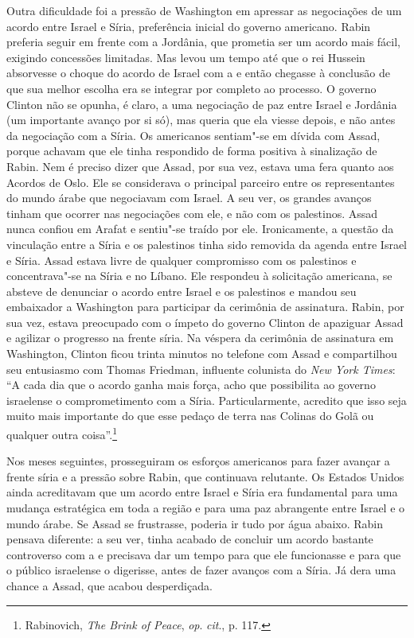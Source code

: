 Outra dificuldade foi a pressão de Washington em apressar as negociações de
um acordo entre Israel e Síria, preferência inicial do governo
americano. Rabin preferia seguir em frente com a Jordânia, que prometia
ser um acordo mais fácil, exigindo concessões limitadas. Mas levou um
tempo até que o rei Hussein absorvesse o choque do acordo de Israel com
a  e então chegasse à conclusão de que sua melhor escolha era se
integrar por completo ao processo. O governo Clinton não se opunha, é
claro, a uma negociação de paz entre Israel e Jordânia (um importante
avanço por si só), mas queria que ela viesse depois, e não antes da
negociação com a Síria. Os americanos sentiam"-se em dívida com Assad,
porque achavam que ele tinha respondido de forma positiva à sinalização
de Rabin. Nem é preciso dizer que Assad, por sua vez, estava uma fera
quanto aos Acordos de Oslo. Ele se considerava o principal parceiro
entre os representantes do mundo árabe que negociavam com Israel. A seu
ver, os grandes avanços tinham que ocorrer nas negociações com ele, e
não com os palestinos. Assad nunca confiou em Arafat e sentiu"-se traído
por ele. Ironicamente, a questão da vinculação entre a Síria e os
palestinos tinha sido removida da agenda entre Israel e Síria. Assad
estava livre de qualquer compromisso com os palestinos e concentrava"-se
na Síria e no Líbano. Ele respondeu à solicitação americana, se absteve
de denunciar o acordo entre Israel e os palestinos e mandou seu
embaixador a Washington para participar da cerimônia de assinatura.
Rabin, por sua vez, estava preocupado com o ímpeto do governo Clinton de
apaziguar Assad e agilizar o progresso na frente síria. Na véspera da
cerimônia de assinatura em Washington, Clinton ficou trinta minutos no
telefone com Assad e compartilhou seu entusiasmo com Thomas Friedman,
influente colunista do \emph{New York Times}: ``A cada dia que o acordo
ganha mais força, acho que possibilita ao governo israelense o
comprometimento com a Síria. Particularmente, acredito que isso seja
muito mais importante do que esse pedaço de terra nas Colinas do Golã ou
qualquer outra coisa''.\footnote{Rabinovich, \emph{The Brink of Peace},
  \emph{op}. \emph{cit}., p. 117.}

Nos meses seguintes, prosseguiram os esforços americanos para fazer
avançar a frente síria e a pressão sobre Rabin, que continuava
relutante. Os Estados Unidos ainda acreditavam que um acordo entre
Israel e Síria era fundamental para uma mudança estratégica em toda a
região e para uma paz abrangente entre Israel e o mundo árabe. Se Assad
se frustrasse, poderia ir tudo por água abaixo. Rabin pensava diferente:
a seu ver, tinha acabado de concluir um acordo bastante controverso com
a  e precisava dar um tempo para que ele funcionasse e para que o
público israelense o digerisse, antes de fazer avanços com a Síria. Já
dera uma chance a Assad, que acabou desperdiçada.

